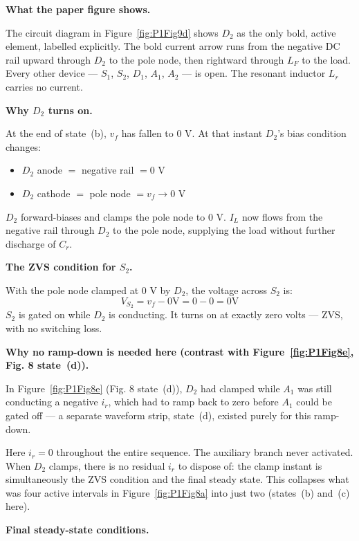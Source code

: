 \documentclass[12pt, a4paper]{article}
\def\,{ }%
\newcommand{\vf}{v_f}
\newcommand{\ir}{i_r}
\newcommand{\IL}{I_L}
\newcommand{\Lr}{L_r}
\newcommand{\figref}[1]{Figure~\ref{#1}}
\begin{document}
\textbf{What the paper figure shows.}

The circuit diagram in \figref{fig:P1Fig9d} shows $D_2$ as the only
bold, active element, labelled explicitly.
The bold current arrow runs from the negative DC rail upward through
$D_2$ to the pole node, then rightward through $L_F$ to the load.
Every other device --- $S_1$, $S_2$, $D_1$, $A_1$, $A_2$ --- is open.
The resonant inductor $\Lr$ carries no current.

\medskip
\textbf{Why $D_2$ turns on.}

At the end of state~(b), $\vf$ has fallen to $0$\,V.
At that instant $D_2$'s bias condition changes:
\begin{itemize}
    \item $D_2$ anode $=$ negative rail $= 0$\,V
    \item $D_2$ cathode $=$ pole node $= \vf \to 0$\,V
\end{itemize}
$D_2$ forward-biases and clamps the pole node to $0$\,V.
$\IL$ now flows from the negative rail through $D_2$ to the pole node,
supplying the load without further discharge of $C_r$.

\medskip
\textbf{The ZVS condition for $S_2$.}

With the pole node clamped at $0$\,V by $D_2$, the voltage across
$S_2$ is:
\begin{equation}
    V_{S_2} = \vf - 0\,\text{V} = 0 - 0 = 0\,\text{V}
    \label{eq:ZVS_S2_fig9}
\end{equation}
$S_2$ is gated on while $D_2$ is conducting.
It turns on at exactly zero volts --- ZVS, with no switching loss.

\medskip
\textbf{Why no ramp-down is needed here (contrast with \figref{fig:P1Fig8e}, Fig.\,8 state~(d)).}

In \figref{fig:P1Fig8e} (Fig.\,8 state~(d)), $D_2$ had clamped while
$A_1$ was still conducting a negative $\ir$, which had to ramp back
to zero before $A_1$ could be gated off --- a separate waveform
strip, state~(d), existed purely for this ramp-down.

Here $\ir = 0$ throughout the entire sequence.
The auxiliary branch never activated.
When $D_2$ clamps, there is no residual $\ir$ to dispose of:
the clamp instant is simultaneously the ZVS condition and the final
steady state.
This collapses what was four active intervals in \figref{fig:P1Fig8a} into just
two (states~(b) and~(c) here).

\medskip
\textbf{Final steady-state conditions.}
\end{document}
